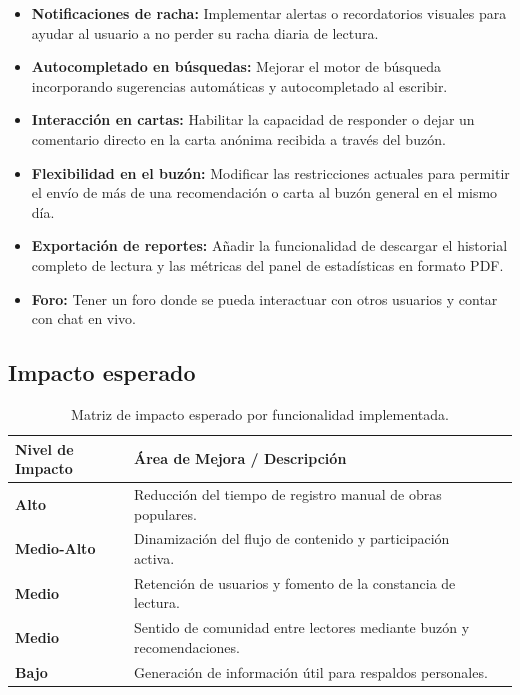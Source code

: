 \documentclass[12pt, atypical, journal]{article}
\begin{document}
\begin{itemize}
	\item \textbf{Notificaciones de racha:} Implementar alertas o recordatorios visuales para ayudar al usuario a no perder su racha diaria de lectura.
	\item \textbf{Autocompletado en búsquedas:} Mejorar el motor de búsqueda incorporando sugerencias automáticas y autocompletado al escribir.
	\item \textbf{Interacción en cartas:} Habilitar la capacidad de responder o dejar un comentario directo en la carta anónima recibida a través del buzón.
	\item \textbf{Flexibilidad en el buzón:} Modificar las restricciones actuales para permitir el envío de más de una recomendación o carta al buzón general en el mismo día.
	\item \textbf{Exportación de reportes:} Añadir la funcionalidad de descargar el historial completo de lectura y las métricas del panel de estadísticas en formato PDF.
	\item \textbf{Foro:} Tener un foro donde se pueda interactuar con otros usuarios y contar con chat en vivo.
\end{itemize}

\subsection{Impacto esperado}
\begin{table}[H]
	\centering
	\begin{tabular}{|l|p{8.5cm}|p{4.5cm}|}
		\hline
		\textbf{Nivel de Impacto} & \textbf{Área de Mejora / Descripción} \\ \hline
		\textbf{Alto} & Reducción del tiempo de registro manual de obras populares.\\ \hline
		\textbf{Medio-Alto} & Dinamización del flujo de contenido y participación activa. \\ \hline
		\textbf{Medio} & Retención de usuarios y fomento de la constancia de lectura. \\ \hline
		\textbf{Medio} & Sentido de comunidad entre lectores mediante buzón y recomendaciones. \\ \hline
		\textbf{Bajo} & Generación de información útil para respaldos personales. \\ \hline
	\end{tabular}
	\caption{Matriz de impacto esperado por funcionalidad implementada.}
	\label{tab:impacto_esperado}
\end{table}
\end{document}
